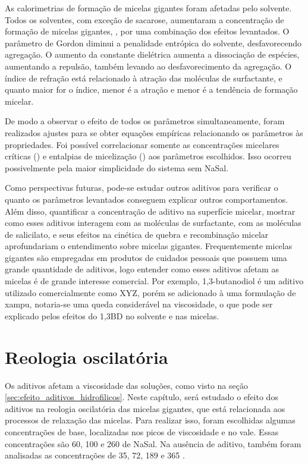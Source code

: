 		As calorimetrias de formação de micelas gigantes foram afetadas pelo solvente. Todos os solventes, com exceção de sacarose, aumentaram a concentração de formação de micelas gigantes, \cwlm, por uma combinação dos efeitos levantados. O parâmetro de Gordon diminui a penalidade entrópica do solvente, desfavorecendo agregação. O aumento da constante dielétrica aumenta a dissociação de espécies, aumentando a repulsão, também levando ao desfavorecimento da agregação. O índice de refração está relacionado à atração das moléculas de surfactante, e quanto maior for o índice, menor é a atração e menor é a tendência de formação micelar.
		
		De modo a observar o efeito de todos os parâmetros simultaneamente, foram realizados ajustes para se obter equações empíricas relacionando os parâmetros às propriedades. Foi possível correlacionar somente as concentrações micelares críticas (\cmc) e entalpias de micelização (\DHmic) aos parâmetros escolhidos. Isso ocorreu possivelmente pela maior simplicidade do sistema sem NaSal.
		
		Como perspectivas futuras, pode-se estudar outros aditivos para verificar o quanto os parâmetros levantados conseguem explicar outros comportamentos. Além disso, quantificar a concentração de aditivo na superfície micelar, mostrar como esses aditivos interagem com as moléculas de surfactante, com as moléculas de salicilato, e seus efeitos na cinética de quebra e recombinação micelar aprofundariam o entendimento sobre micelas gigantes. Frequentemente micelas gigantes são empregadas em produtos de cuidados pessoais que possuem uma grande quantidade de aditivos, logo entender como esses aditivos afetam as micelas é de grande interesse comercial. Por exemplo, 1,3-butanodiol é um aditivo utilizado comercialmente como XYZ, porém se adicionado à uma formulação de xampu, notaria-se uma queda considerável na viscosidade, o que pode ser explicado pelos efeitos do 1,3BD no solvente e nas micelas.

		
		
	\chapter{Reologia oscilatória}
		Os aditivos afetam a viscosidade das soluções, como visto na seção \ref{sec:efeito_aditivos_hidrofilicos}. Neste capítulo, será estudado o efeito dos aditivos na reologia oscilatória das micelas gigantes, que está relacionada aos processos de relaxação das micelas. Para realizar isso, foram escolhidas algumas concentrações de base, localizadas nos picos de viscosidade e no vale. Essas concentrações são 60, 100 e 260\mM{} de NaSal. Na ausência de aditivo, também foram analisadas as concentrações de 35, 72, 189 e 365 \mM.
		
